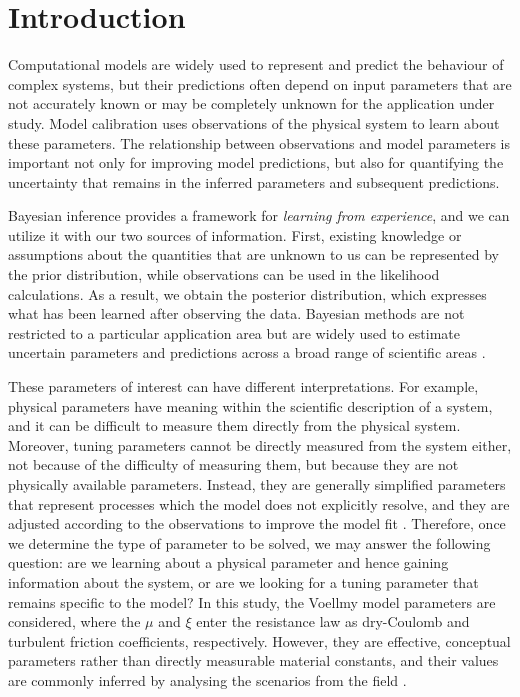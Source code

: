 \chapter{Introduction}
\label{ch:introduction}


Computational models are widely used to represent and predict the behaviour of complex systems, but their predictions often depend on input parameters that are not accurately known or may be completely unknown for the application under study. Model calibration uses observations of the physical system to learn about these parameters. The relationship between observations and model parameters is important not only for improving model predictions, but also for quantifying the uncertainty that remains in the inferred parameters and subsequent predictions.

Bayesian inference provides a framework for \emph{learning from experience}, and we can utilize it with our two sources of information. First, existing knowledge or assumptions about the quantities that are unknown to us can be represented by the prior distribution, while observations can be used in the likelihood calculations. As a result, we obtain the posterior distribution, which expresses what has been learned after observing the data. Bayesian methods are not restricted to a particular application area but are widely used to estimate uncertain parameters and predictions across a broad range of scientific areas \autocite{vanDeSchoot2021}.

These parameters of interest can have different interpretations. For example, physical parameters have meaning within the scientific description of a system, and it can be difficult to measure them directly from the physical system. Moreover, tuning parameters cannot be directly measured from the system either, not because of the difficulty of measuring them, but because they are not physically available parameters. Instead, they are generally simplified parameters that represent processes which the model does not explicitly resolve, and they are adjusted according to the observations to improve the model fit \autocite{Brynjarsdottir2014}. Therefore, once we determine the type of parameter to be solved, we may answer the following question: are we learning about a physical parameter and hence gaining information about the system, or are we looking for a tuning parameter that remains specific to the model? In this study, the Voellmy model parameters are considered, where the $\mu$ and $\xi$ enter the resistance law as dry-Coulomb and turbulent friction coefficients, respectively. However, they are effective, conceptual parameters rather than directly measurable material constants, and their values are commonly inferred by analysing the scenarios from the field \autocite{Heredia2020,Yildiz2023}.

